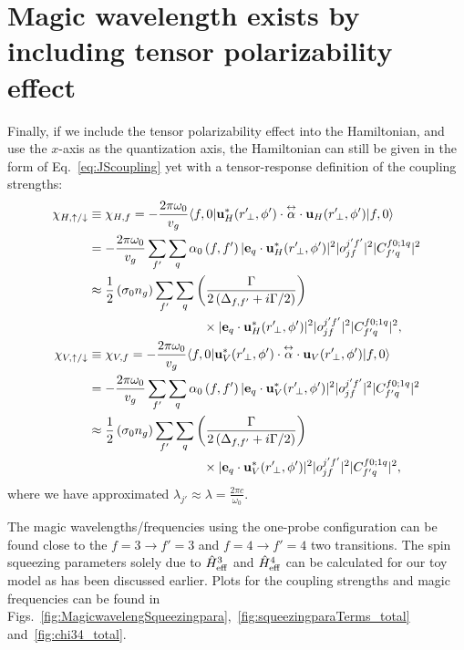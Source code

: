 \section{Magic wavelength exists by including tensor polarizability effect}
Finally, if we include the tensor polarizability effect into the Hamiltonian, and use the $ x $-axis as the 
quantization axis, the Hamiltonian can still be given in the form of Eq.~\ref{eq:JScoupling} yet with a 
tensor-response definition of the coupling strengths:
\begin{align}
\chi_{H,\uparrow/\downarrow} & \equiv \chi_{H,f} =- \frac{2\pi \omega_0}{v_g} \bra{f,0} 
	\mathbf{u}^*_H(r^\prime\!_\perp, \phi') \cdot \tensor{\alpha} \cdot 
	\mathbf{u}_{H}(r^\prime\!_\perp, 
	\phi') \ket{f,0} \\
	& =- \frac{2\pi \omega_0}{v_g} \sum_{f'} \sum_q \alpha_0\left( f,f'  \right) |\mathbf{e}_q \cdot 
	\mathbf{u}_H^*(r^\prime\!_\perp,\phi')|^2 |o^{j'f'}_{jf} |^2 
	|C^{f 0;1q}_{f' q}|^2\\
	& \approx  \frac{1}{2} \left( \sigma_0 n_g  \right) \sum_{f'} \sum_q\left( 
		\frac{\Gamma}{2 
		\left(\Delta_{f,f'}+i\Gamma/2\right) }  \right)\nonumber\\
		&\quad\quad\quad\quad\quad\quad\quad\quad\quad \times |\mathbf{e}_q \cdot 
		\mathbf{u}_H^*(r^\prime\!_\perp,\phi')|^2 |o^{j'f'}_{jf} |^2 
		|C^{f 0;1q}_{f' q}|^2,\\
\chi_{V,\uparrow/\downarrow} & \equiv \chi_{V,f} =- \frac{2\pi \omega_0}{v_g} \bra{f,0} 
	\mathbf{u}^*_V(r^\prime\!_\perp, \phi') \cdot \tensor{\alpha} \cdot 
	\mathbf{u}_{V}(r^\prime\!_\perp, 
	\phi') \ket{f,0} \\
	& =- \frac{2\pi \omega_0}{v_g} \sum_{f'} \sum_q \alpha_0\left( f,f'  \right) |\mathbf{e}_q \cdot 
	\mathbf{u}_V^*(r^\prime\!_\perp,\phi')|^2 |o^{j'f'}_{jf} |^2 
	|C^{f 0;1q}_{f' q}|^2\\
	& \approx  \frac{1}{2} \left( \sigma_0 n_g  \right) \sum_{f'} \sum_q\left( 
		\frac{\Gamma}{2 
		\left(\Delta_{f,f'}+i\Gamma/2\right) }  \right)\nonumber\\
		&\quad\quad\quad\quad\quad\quad\quad\quad\quad \times |\mathbf{e}_q \cdot 
		\mathbf{u}_V^*(r^\prime\!_\perp,\phi')|^2 |o^{j'f'}_{jf} |^2 
		|C^{f 0;1q}_{f' q}|^2,
\end{align}
where we have approximated $ \lambda_{j'}\approx \lambda = \frac{2\pi c}{\omega_0} $.  

The magic wavelengths/frequencies using the one-probe configuration can be found close to the $ 
f=3\rightarrow f'=3 $ and $ f=4\rightarrow f'=4 $ two transitions.
The spin squeezing parameters solely due to $ \hat{H}^3_{\rm eff} $ and $ \hat{H}^4_{\rm eff} $ can be calculated for our toy model as has been discussed earlier.
Plots for the coupling strengths and magic frequencies can be found in 
Figs.~\ref{fig:MagicwavelengSqueezingpara},~\ref{fig:squeezingparaTerms_total} 
and~\ref{fig:chi34_total}.

